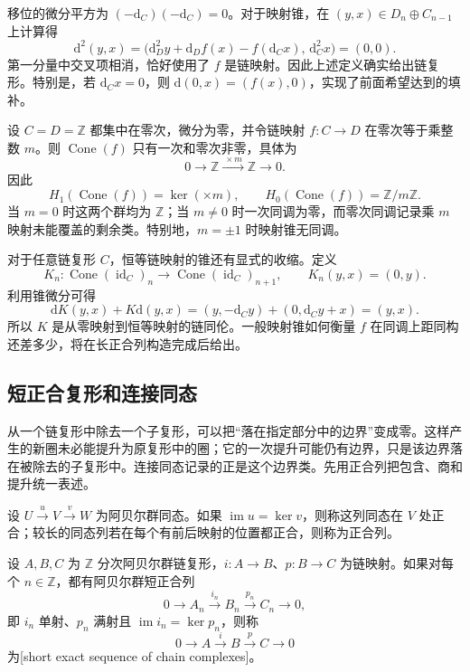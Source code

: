 移位的微分平方为 \((-\mathrm{d}_C)(-\mathrm{d}_C)=0\)。对于映射锥，在 \((y,x)\in D_n\oplus C_{n-1}\) 上计算得
\[
	\mathrm{d}^2(y,x)
	=\bigl(\mathrm{d}_D^2y+\mathrm{d}_Df(x)-f(\mathrm{d}_Cx),
		\,\mathrm{d}_C^2x\bigr)=(0,0).
\]
第一分量中交叉项相消，恰好使用了 \(f\) 是链映射。因此上述定义确实给出链复形。特别是，若 \(\mathrm{d}_Cx=0\)，则 \(\mathrm{d}(0,x)=(f(x),0)\)，实现了前面希望达到的填补。

\begin{example}\label{g2:exm:cone-integer-multiple}
	设 \(C=D=\mathbb Z\) 都集中在零次，微分为零，并令链映射 \(f:C\to D\) 在零次等于乘整数 \(m\)。则 \(\operatorname{Cone}(f)\) 只有一次和零次非零，具体为
	\[
		0\longrightarrow\mathbb Z\xrightarrow{\ \times m\ }\mathbb Z\longrightarrow0.
	\]
	因此
	\[
		H_1(\operatorname{Cone}(f))=\ker(\times m),\qquad
		H_0(\operatorname{Cone}(f))=\mathbb Z/m\mathbb Z.
	\]
	当 \(m=0\) 时这两个群均为 \(\mathbb Z\)；当 \(m\ne0\) 时一次同调为零，而零次同调记录乘 \(m\) 映射未能覆盖的剩余类。特别地，\(m=\pm1\) 时映射锥无同调。
\end{example}

对于任意链复形 \(C\)，恒等链映射的锥还有显式的收缩。定义
\[
	K_n:\operatorname{Cone}(\operatorname{id}_C)_n
	\longrightarrow\operatorname{Cone}(\operatorname{id}_C)_{n+1},
	\qquad K_n(y,x)=(0,y).
\]
利用锥微分可得
\[
	\mathrm{d}K(y,x)+K\mathrm{d}(y,x)
	=(y,-\mathrm{d}_Cy)+(0,\mathrm{d}_Cy+x)=(y,x).
\]
所以 \(K\) 是从零映射到恒等映射的链同伦。一般映射锥如何衡量 \(f\) 在同调上距同构还差多少，将在长正合列构造完成后给出。

\subsection{短正合复形和连接同态}
\label{g2:subsec:0201:03}
从一个链复形中除去一个子复形，可以把“落在指定部分中的边界”变成零。这样产生的新圈未必能提升为原复形中的圈；它的一次提升可能仍有边界，只是该边界落在被除去的子复形中。连接同态记录的正是这个边界类。先用正合列把包含、商和提升统一表述。

\begin{definition}[正合列与链复形的短正合列]\label{g2:def:short-exact-complex}
	设 \(U\xrightarrow{u}V\xrightarrow{v}W\) 为阿贝尔群同态。如果 \(\operatorname{im}u=\ker v\)，则称这列同态在 \(V\) 处正合；较长的同态列若在每个有前后映射的位置都正合，则称为正合列。

	设 \(A,B,C\) 为 \(\mathbb Z\) 分次阿贝尔群链复形，\(i:A\to B\)、\(p:B\to C\) 为链映射。如果对每个 \(n\in\mathbb Z\)，都有阿贝尔群短正合列
	\[
		0\longrightarrow A_n\xrightarrow{i_n}B_n\xrightarrow{p_n}C_n\longrightarrow0,
	\]
	即 \(i_n\) 单射、\(p_n\) 满射且 \(\operatorname{im}i_n=\ker p_n\)，则称
	\[
		0\longrightarrow A\xrightarrow{i}B\xrightarrow{p}C\longrightarrow0
	\]
	为[short exact sequence of chain complexes]。
\end{definition}

